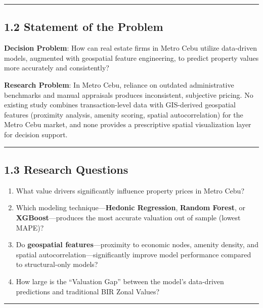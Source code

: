 \begin{center}\rule{0.5\linewidth}{0.5pt}\end{center}

\subsection{\texorpdfstring{\textbf{1.2 Statement of the Problem}}{1.2 Statement of the Problem}}\label{statement-of-the-problem}

\textbf{Decision Problem}: How can real estate firms in Metro Cebu utilize data-driven models, augmented with geospatial feature engineering, to predict property values more accurately and consistently?

\textbf{Research Problem}: In Metro Cebu, reliance on outdated administrative benchmarks and manual appraisals produces inconsistent, subjective pricing. No existing study combines transaction-level data with GIS-derived geospatial features (proximity analysis, amenity scoring, spatial autocorrelation) for the Metro Cebu market, and none provides a prescriptive spatial visualization layer for decision support.

\begin{center}\rule{0.5\linewidth}{0.5pt}\end{center}

\subsection{\texorpdfstring{\textbf{1.3 Research Questions}}{1.3 Research Questions}}\label{research-questions}

\begin{enumerate}
\item What value drivers significantly influence property prices in Metro Cebu?
\item Which modeling technique---\textbf{Hedonic Regression}, \textbf{Random Forest}, or \textbf{XGBoost}---produces the most accurate valuation out of sample (lowest MAPE)?
\item Do \textbf{geospatial features}---proximity to economic nodes, amenity density, and spatial autocorrelation---significantly improve model performance compared to structural-only models?
\item How large is the ``Valuation Gap'' between the model's data-driven predictions and traditional BIR Zonal Values?
\end{enumerate}

\begin{center}\rule{0.5\linewidth}{0.5pt}\end{center}

